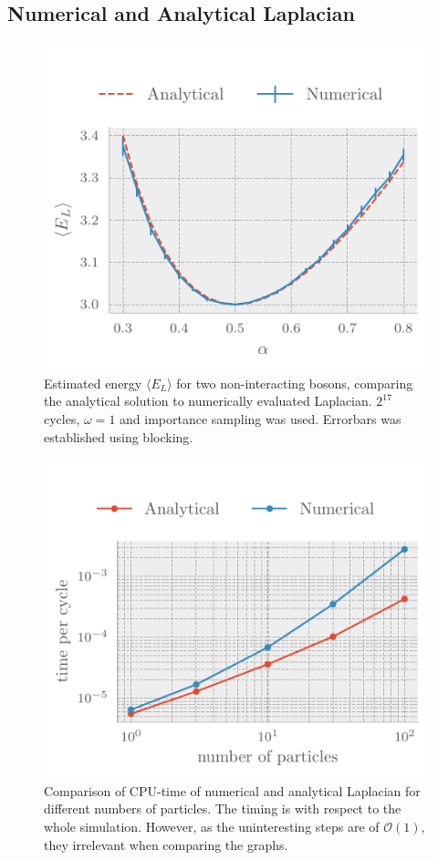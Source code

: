 \subsection{Numerical and Analytical Laplacian}
\begin{figure}[ht]
	\includegraphics[]{figures/numericalLap.pdf}
	\centering
	\caption{Estimated energy $\langle E_{L} \rangle$ for two non-interacting
      bosons, comparing the analytical solution to numerically evaluated
      Laplacian. $2^{17}$ cycles, $\omega = 1$ and importance sampling was used. Errorbars was established using blocking. }
	\label{fig:numerical lap}
\end{figure}

\begin{figure}[ht]
	\includegraphics[]{figures/numericalTime.pdf}
	\centering
	\caption{Comparison of CPU-time of numerical and analytical Laplacian for
      different numbers of particles. The timing is with respect to the whole
      simulation. However, as the uninteresting steps
    are of \(\mathcal{O}(1)\), they irrelevant when comparing the graphs.}
	\label{fig:numerical time}
\end{figure}

